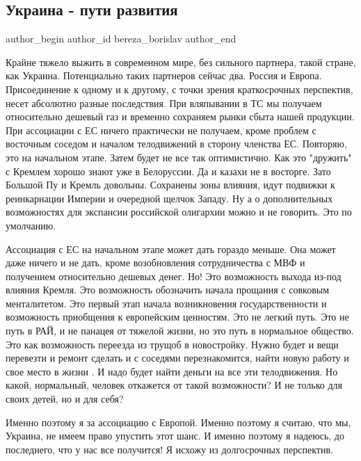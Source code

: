  
 
 
 
 
 
\subsection{Украина - пути развития}
\label{sec:23_11_2013.fb.bereza_borislav.1.ukraina_puti_razvitia}
 
\ifcmt
 author_begin
   author_id bereza_borislav
 author_end
\fi

Крайне тяжело выжить в современном мире, без сильного партнера, такой стране,
как Украина. Потенциально таких партнеров сейчас два. Россия и Европа.
Присоединение к одному и к другому, с точки зрения краткосрочных перспектив,
несет абсолютно разные последствия. При вляпывании в ТС мы получаем
относительно дешевый газ и временно сохраняем рынки сбыта нашей продукции. При
ассоциации с ЕС ничего практически не получаем, кроме проблем с восточным
соседом и  началом телодвижений в сторону членства ЕС. Повторяю, это на
начальном этапе. Затем будет не все так оптимистично. Как это "дружить" с
Кремлем хорошо знают уже в Белоруссии. Да и казахи не в восторге. Зато Большой
Пу и Кремль довольны. Сохранены зоны влияния, идут подвижки к реинкарнации
Империи и очередной щелчок Западу. Ну а о дополнительных возможностях для
экспансии российской олигархии можно и не говорить. Это по умолчанию. 

Ассоциация с ЕС на начальном этапе может дать гораздо меньше. Она может даже
ничего и не дать, кроме возобновления сотрудничества с МВФ и получением
относительно дешевых денег. Но! Это возможность выхода из-под влияния Кремля.
Это возможность обозначить начала прощания с совковым менталитетом. Это первый
этап начала возникновения государственности и возможность приобщения к
европейским ценностям. Это не легкий путь. Это не путь в РАЙ, и не панацея от
тяжелой жизни, но это путь в нормальное общество. Это как возможность переезда
из трущоб в новостройку. Нужно будет и вещи перевезти и ремонт сделать и с
соседями перезнакомится, найти новую работу и свое место в жизни . И надо будет
найти деньги на все эти телодвижения. Но какой, нормальный, человек откажется
от такой возможности? И не только для своих детей, но и для себя?

Именно поэтому я за ассоциацию с Европой. Именно поэтому я считаю, что мы,
Украина, не имеем право упустить этот шанс. И именно поэтому я надеюсь, до
последнего, что у нас все получится! Я исхожу из долгосрочных перспектив.

